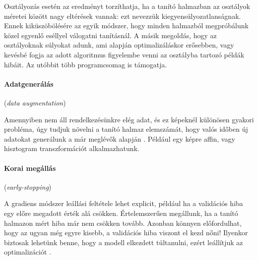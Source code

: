 Osztályozás esetén az eredményt torzíthatja, ha a tanító halmazban az osztályok méretei között
nagy eltérések vannak: ezt nevezzük kiegyensúlyozatlanságnak.
Ennek kiküszöbölésére az egyik módszer, hogy minden halmazból 
megpróbálunk közel egyenlő eséllyel válogatni tanításnál. A másik megoldás, hogy az 
osztályoknak súlyokat adunk,
ami alapján optimalizáláskor erősebben, vagy kevésbé fogja
az adott algoritmus figyelembe venni az osztályba tartozó példák hibáit. Az utóbbit több programcsomag is támogatja.

\paragraph{Adatgenerálás} (\textit{data augmentation})

Amennyiben nem áll rendelkezésünkre elég adat, és ez képeknél 
különösen gyakori probléma, úgy tudjuk növelni a tanító halmaz
elemszámát, hogy valós időben új adatokat generálunk a már
meglévők alapján \cite{krizhevsky2012imagenet}. Például egy képre affin, vagy hisztogram transzformációt alkalmazhatunk.


\paragraph{Korai megállás} (\textit{early-stopping})

A gradiens módszer leállási feltétele lehet explicit, például ha a validációs hiba egy előre megadott érték alá csökken. Értelemszerűen megállunk, ha a tanító halmazon mért hiba már nem csökken tovább.
Azonban könnyen előfordulhat, hogy az ugyan még egyre kisebb, a validációs hiba viszont el kezd nőni! Ilyenkor biztosak lehetünk benne, hogy a modell elkezdett túltanulni, ezért leállítjuk az optimalizációt  \cite{earlystopping}.




